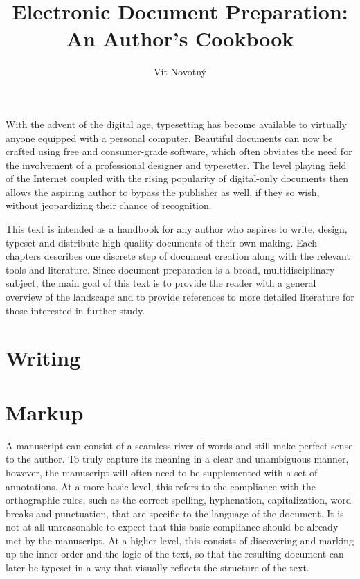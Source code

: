 \documentclass{book}
\begin{document}
\frontmatter
\title{Electronic Document Preparation: An Author's Cookbook}
\author{Vít Novotný}
\maketitle
\tableofcontents
\mainmatter

With the advent of the digital age, typesetting has become available to
virtually anyone equipped with a personal computer. Beautiful documents can now
be crafted using free and consumer-grade software, which often obviates the need
for the involvement of a professional designer and typesetter. The level playing
field of the Internet coupled with the rising popularity of digital-only
documents then allows the aspiring author to bypass the publisher as well, if
they so wish, without jeopardizing their chance of recognition.

This text is intended as a handbook for any author who aspires to write, design,
typeset and distribute high-quality documents of their own making. Each
chapters describes one discrete step of document creation along with the
relevant tools and literature. Since document preparation is a broad,
multidisciplinary subject, the main goal of this text is to provide the reader
with a general overview of the landscape and to provide references to more
detailed literature for those interested in further study.

\chapter{Writing}

\chapter{Markup}
A manuscript can consist of a seamless river of words and still make perfect
sense to the author. To truly capture its meaning in a clear and unambiguous
manner, however, the manuscript will often need to be supplemented with a set of
annotations. At a more basic level, this refers to the compliance with the
orthographic rules, such as the correct spelling, hyphenation, capitalization,
word breaks and punctuation, that are specific to the language of the document.
It is not at all unreasonable to expect that this basic compliance should be
already met by the manuscript.  At a higher level, this consists of discovering
and marking up the inner order and the logic of the text, so that the resulting
document can later be typeset in a way that visually reflects the structure of
the text.
\end{document}
